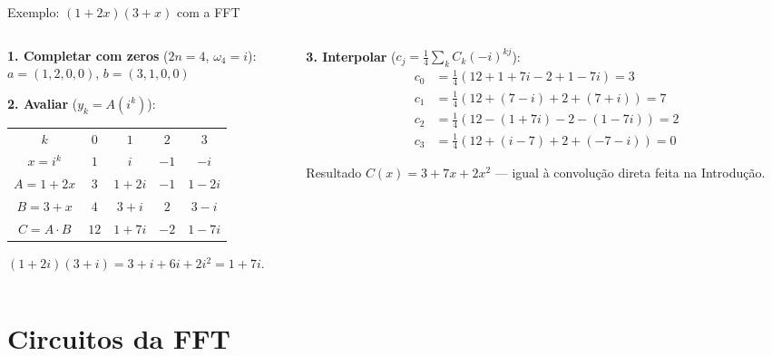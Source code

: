\documentclass[aspectratio=169,10pt]{beamer}
\begin{document}
\begin{frame}{Exemplo: $(1+2x)(3+x)$ com a FFT}
  \begin{columns}[T]
    \begin{column}{0.5\textwidth}
      \small
      \textbf{1. Completar com zeros} ($2n = 4$, $\omega_4 = i$):\\
      $a = (1,2,0,0)$, \; $b = (3,1,0,0)$

      \vspace{4pt}
      \textbf{2. Avaliar} ($y_k = A(i^k)$):
      \begin{center}
        \begin{tabular}{ccccc}
          \toprule
          $k$ & $0$ & $1$ & $2$ & $3$ \\
          $x = i^k$ & $1$ & $i$ & $-1$ & $-i$ \\
          \midrule
          $A = 1{+}2x$ & $3$ & $1{+}2i$ & $-1$ & $1{-}2i$ \\
          $B = 3{+}x$  & $4$ & $3{+}i$ & $2$ & $3{-}i$ \\
          \midrule
          $C = A\cdot B$ & $12$ & $1{+}7i$ & $-2$ & $1{-}7i$ \\
          \bottomrule
        \end{tabular}
      \end{center}
      {\scriptsize $(1{+}2i)(3{+}i) = 3 + i + 6i + 2i^2 = 1 + 7i$.}
    \end{column}
    \begin{column}{0.46\textwidth}
      \small
      \textbf{3. Interpolar} ($c_j = \frac14\sum_k C_k (-i)^{kj}$):
      \begin{align*}
        c_0 &= \tfrac14(12 + 1{+}7i - 2 + 1{-}7i) = 3\\
        c_1 &= \tfrac14(12 + (7{-}i) + 2 + (7{+}i)) = 7\\
        c_2 &= \tfrac14(12 - (1{+}7i) - 2 - (1{-}7i)) = 2\\
        c_3 &= \tfrac14(12 + (i{-}7) + 2 + (-7{-}i)) = 0
      \end{align*}
      \begin{exampleblock}{Resultado}
        $C(x) = 3 + 7x + 2x^2$ --- igual à convolução direta feita na Introdução.
      \end{exampleblock}
    \end{column}
  \end{columns}
\end{frame}

\section{Circuitos da FFT}
\end{document}
